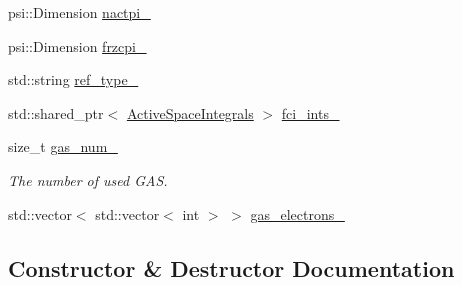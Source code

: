 \begin{DoxyCompactItemize}
\item 
psi\+::\+Dimension \mbox{\hyperlink{classforte_1_1_c_i___reference_a867494fbee610c7a5dcad09487dabb82}{nactpi\+\_\+}}
\item 
psi\+::\+Dimension \mbox{\hyperlink{classforte_1_1_c_i___reference_a8e501059a51dd7e71a679b9d42fdff04}{frzcpi\+\_\+}}
\item 
std\+::string \mbox{\hyperlink{classforte_1_1_c_i___reference_a1cc19b3a5dc9d1a93c3c812bf6a71a7d}{ref\+\_\+type\+\_\+}}
\item 
std\+::shared\+\_\+ptr$<$ \mbox{\hyperlink{classforte_1_1_active_space_integrals}{Active\+Space\+Integrals}} $>$ \mbox{\hyperlink{classforte_1_1_c_i___reference_aa20ed3648fc1f11c723dbd2b491fc950}{fci\+\_\+ints\+\_\+}}
\item 
size\+\_\+t \mbox{\hyperlink{classforte_1_1_c_i___reference_afab0fbcf5e7f80f516ae0b814ea93911}{gas\+\_\+num\+\_\+}}
\begin{DoxyCompactList}\small\item\em The number of used G\+AS. \end{DoxyCompactList}\item 
std\+::vector$<$ std\+::vector$<$ int $>$ $>$ \mbox{\hyperlink{classforte_1_1_c_i___reference_ab046cdbcafe1926a6a2a9406db621210}{gas\+\_\+electrons\+\_\+}}
\end{DoxyCompactItemize}


\subsection{Constructor \& Destructor Documentation}
\mbox{\label{classforte_1_1_c_i___reference_ace7be9be58a678458e45ef781140c8ae}} 
